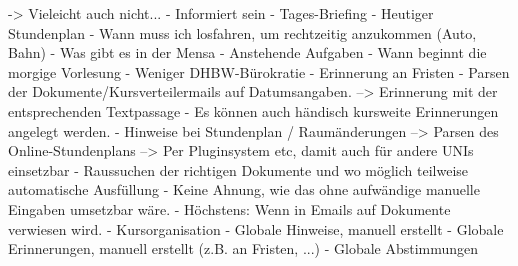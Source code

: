                 -> Vieleicht auch nicht...
        - Informiert sein
            - Tages-Briefing
                - Heutiger Stundenplan
                - Wann muss ich losfahren, um rechtzeitig anzukommen (Auto, Bahn)
                - Was gibt es in der Mensa
                - Anstehende Aufgaben
                - Wann beginnt die morgige Vorlesung
        - Weniger DHBW-Bürokratie
            - Erinnerung an Fristen
                - Parsen der Dokumente/Kursverteilermails auf Datumsangaben. --> Erinnerung mit der entsprechenden Textpassage
                - Es können auch händisch kursweite Erinnerungen angelegt werden.
            - Hinweise bei Stundenplan / Raumänderungen
                --> Parsen des Online-Stundenplans
                --> Per Pluginsystem etc, damit auch für andere UNIs einsetzbar
            - Raussuchen der richtigen Dokumente und wo möglich teilweise automatische Ausfüllung
                - Keine Ahnung, wie das ohne aufwändige manuelle Eingaben umsetzbar wäre.
                - Höchstens: Wenn in Emails auf Dokumente verwiesen wird.
        - Kursorganisation
            - Globale Hinweise, manuell erstellt
            - Globale Erinnerungen, manuell erstellt (z.B. an Fristen, ...)
            - Globale Abstimmungen


